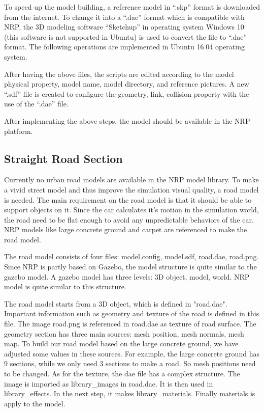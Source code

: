 To speed up the model building, a reference model in ``.skp'' format is downloaded from the internet. To change it into a ``.dae'' format which is compatible with NRP, the 3D modeling software ``Sketchup'' in operating system Windows 10 (this software is not supported in Ubuntu) is used to convert the file to ``.dae'' format. The following operations are implemented in Ubuntu 16.04 operating system. 



After having the above files, the scripts are edited according to the model physical property, model name, model directory, and reference pictures. A new ``.sdf'' file is created to configure the geometry, link, collision property with the use of the ``.dae'' file. 

After implementing the above steps, the model should be available in the NRP platform.

\subsection{Straight Road Section}

Currently no urban road models are available in the NRP model library. To make a vivid street model and thus improve the simulation visual quality, a road model is needed. The main requirement on the road model is that it should be able to support objects on it. Since the car calculates it's motion in the simulation world, the road need to be flat enough to avoid any unpredictable behaviors of the car. NRP models like large concrete ground and carpet are referenced to make the road model.


The road model consists of four files: model.config, model.sdf, road.dae, road.png. Since NRP is partly based on Gazebo, the model structure is quite similar to the gazebo model. A gazebo model has three levels: 3D object, model, world. NRP model is quite similar to this structure. 


The road model starts from a 3D object, which is defined in "road.dae". Important information such as geometry and texture of the road is defined in this file. The image road.png is referenced in road.dae as texture of road surface. The geometry section has three main sources: mesh position, mesh normals, mesh map. To build our road model based on the large concrete ground, we have adjusted some values in these sources. For example, the large concrete ground has 9 sections, while we only need 3 sections to make a road. So mesh positions need to be changed. As for the texture, the dae file has a complex structure. The image is imported as library\_images in road.dae. It is then used in library\_effects. In the next step, it makes library\_materials. Finally materials is apply to the model. 


